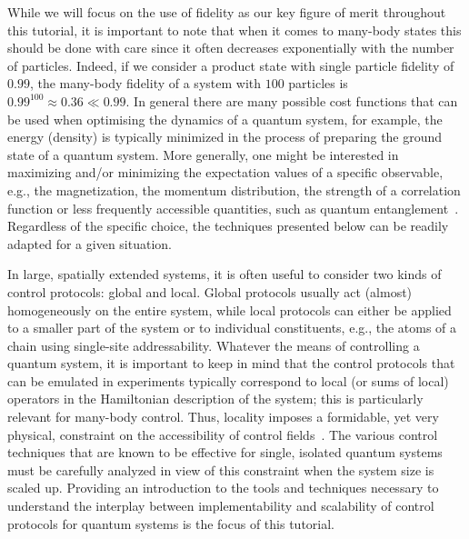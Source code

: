 While we will focus on the use of fidelity as our key figure of merit throughout this tutorial, it is important to note that when it comes to many-body states this should be done with care since it often decreases exponentially with the number of particles. Indeed, if we consider a product state with single particle fidelity of $0.99$, the many-body fidelity of a system with $100$ particles is $0.99^{100}\approx 0.36\ll 0.99$. In general there are many possible cost functions that can be used when optimising the dynamics of a quantum system, for example, the energy (density) is typically minimized in the process of preparing the ground state of a quantum system. More generally, one might be interested in maximizing and/or minimizing the expectation values of a specific observable, e.g., the magnetization, the momentum distribution, the strength of a correlation function or less frequently accessible quantities, such as quantum entanglement~\cite{kraus2001optimal,goerz2011,watts2015optimizing,tashev2024reinforcement}.  Regardless of the specific choice, the techniques presented below can be readily adapted for a given situation.

In large, spatially extended systems, it is often useful to consider two kinds of control protocols: global and local. Global protocols usually act (almost) homogeneously on the entire system, while local protocols can either be applied to a smaller part of the system or to individual constituents, e.g., the atoms of a chain using single-site addressability. Whatever the means of controlling a quantum system, it is important to keep in mind that the control protocols that can be emulated in experiments typically correspond to local (or sums of local) operators in the Hamiltonian description of the system; this is particularly relevant for many-body control. Thus, locality imposes a formidable, yet very physical, constraint on the accessibility of control fields~\cite{bukov2019geometric}. The various control techniques that are known to be effective for single, isolated quantum systems must be carefully analyzed in view of this constraint when the system size is scaled up. Providing an introduction to the tools and techniques necessary to understand the interplay between implementability and scalability of control protocols for quantum systems is the focus of this tutorial. 


